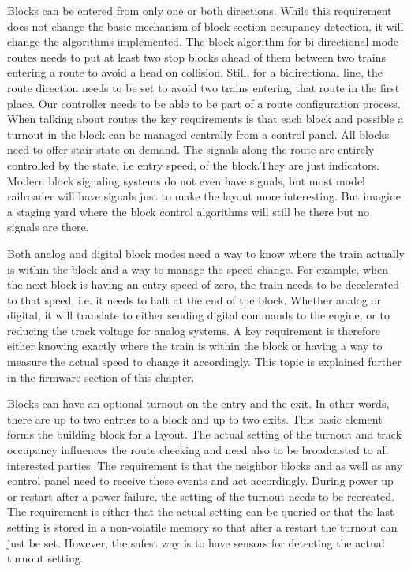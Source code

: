 Blocks can be entered from only one or both directions. While this requirement does not change the basic mechanism of block section occupancy detection, it will change the algorithms implemented. The block algorithm for bi-directional mode routes needs to put at least two stop blocks ahead of them between two trains entering a route to avoid a head on collision. Still, for a bidirectional line, the route direction needs to be set to avoid two trains entering that route in the first place. Our controller needs to be able to be part of a route configuration process. When talking about routes the key requirements is that each block and possible a turnout in the block can be managed centrally from a control panel. All blocks need to offer stair state on demand. The signals along the route are entirely controlled by the state, i.e entry speed, of the block.They are just indicators. Modern block signaling systems do not even have signals, but most model railroader will have signals just to make the layout more interesting. But imagine a staging yard where the block control algorithms will still be there but no signals are there.

Both analog and digital block modes need a way to know where the train actually is within the block and a way to manage the speed change. For example, when the next block is having an entry speed of zero, the train needs to be decelerated to that speed, i.e. it needs to halt at the end of the block. Whether analog or digital, it will translate to either sending digital commands to the engine, or to reducing the track voltage for analog systems. A key requirement is therefore either knowing exactly where the train is within the block or having a way to measure the actual speed to change it accordingly. This topic is explained further in the firmware section of this chapter.

Blocks can have an optional turnout on the entry and the exit. In other words, there are up to two entries to a block and up to two exits. This basic element forms the building block for a layout. The actual setting of the turnout and track occupancy influences the route checking and need also to be broadcasted to all interested parties. The requirement is that the neighbor blocks and as well as any control panel need to receive these events and act accordingly. During power up or restart after a power failure, the setting of the turnout needs to be recreated. The requirement is either that the actual setting can be queried or that the last setting is stored in a non-volatile memory so that after a restart the turnout can just be set. However, the safest way is to have sensors for detecting the actual turnout setting.

